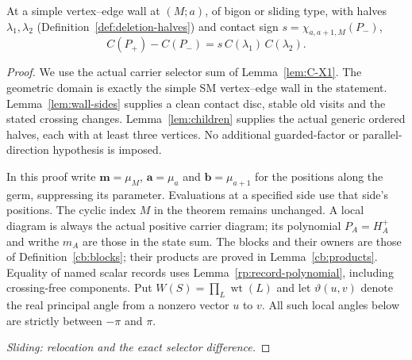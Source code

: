 \begin{theorem}\label{thm:C-S7}
At a simple vertex--edge wall at $(M;a)$, of bigon or sliding type, with
halves $\lambda_1,\lambda_2$ (Definition~\ref{def:deletion-halves}) and
contact sign $s=\chi_{a,a+1,M}(P_-)$,
\[
C(P_+)-C(P_-)=s\,C(\lambda_1)\,C(\lambda_2).
\]
\end{theorem}
\begin{proof}
We use the actual carrier selector sum of Lemma~\ref{lem:C-X1}.
The geometric domain is exactly the simple SM vertex--edge wall in the
statement. Lemma~\ref{lem:wall-sides} supplies a clean contact disc,
stable old visits and the stated crossing changes. Lemma~\ref{lem:children}
supplies the actual generic ordered halves, each with at least three
vertices. No additional guarded-factor or parallel-direction hypothesis
is imposed.

In this proof write $\mathbf m=\mu_M$, $\mathbf a=\mu_a$ and
$\mathbf b=\mu_{a+1}$ for the positions along the germ, suppressing its parameter. Evaluations
at a specified side use that side's positions. The cyclic index $M$
in the theorem remains unchanged. A local diagram is always the actual
positive carrier diagram; its polynomial $P_A=H_A^+$ and writhe $m_A$
are those in the state sum. The blocks and their owners are those of
Definition~\ref{cb:blocks}; their products are proved in
Lemma~\ref{cb:products}. Equality of named scalar records uses
Lemma~\ref{rp:record-polynomial}, including crossing-free components.
Put $W(S)=\prod_L\operatorname{wt}(L)$ and let $\vartheta(u,v)$
denote the real principal angle from a nonzero vector $u$ to $v$.
All such local angles below are strictly between $-\pi$ and $\pi$.

\par\medskip\noindent\emph{Sliding: relocation and the exact selector difference.}\par


\end{proof}
